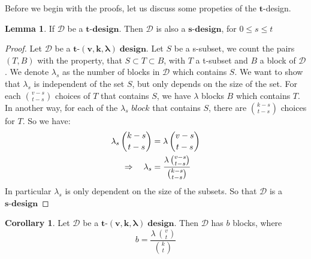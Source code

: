 \documentclass[12pt]{article}
\theoremstyle{definition}
\newtheorem{lemma}[theorem]{Lemma}
\newtheorem{collary}[theorem]{Corollary}
\numberwithin{equation}{theorem}
\numberwithin{figure}{theorem}
\newcommand{\tCompleteDesign}{\ensuremath{\bm{t\mbox{-}(v,k,\lambda)\; design}}}
\newcommand{\myBlock}{{block}}
\newcommand{\pluralMyBlock}{{blocks}}
\newcommand{\xDesign}[1]{\ensuremath{\bm{#1\mbox{-}design}}}
\newcommand{\dDes}{\ensuremath{\mathcal{D}}}
\begin{document}
Before we begin with the proofs, let us discuss some propeties of the $\bm{t}$-design.
\begin{lemma}\label{propTdesign}
If {\dDes} be a $\bm{t\mbox{-}design}$. Then {\dDes} is also a $\bm{s\mbox{-}design}$, for $0 \leq s \leq t$
\end{lemma}
\begin{proof}
Let {\dDes} be a \tCompleteDesign.
Let $S$ be a s-subset, we count the pairs $(T,B)$ with the property, that $S \subset T \subset B$, with $T$ a t-subset and $B$ a block of {\dDes}. We denote $\lambda_s$ as the number of blocks in {\dDes} which contains $S$. We want to show that $\lambda_s$ is independent of the set $S$, but only depends on the size of the set. 
For each $\binom{v-s}{t-s}$ choices of $T$ that contains $S$, we have $\lambda$ {\pluralMyBlock} $B$ which contains $T$. In another way, for each of the $\lambda_s$ $\myBlock$ that contains $S$, there are $\binom{k-s}{t-s}$ choices for $T$. So we have:
\begin{align}
	\lambda_s \, \binom{k-s}{t-s} &= \lambda \, \binom{v-s}{t-s} \notag\\
	\Rightarrow  \quad \lambda_s &= \frac{\lambda \, \binom{v-s}{t-s}}{\binom{k-s}{t-s}} \label{sDesign}
\end{align}
In particular $\lambda_s$ is only dependent on the size of the subsets. So that {\dDes} is a \xDesign{s}
\end{proof}

\begin{collary}\label{blockCount}
Let {\dDes} be a \tCompleteDesign.
Then {\dDes} has $b$ blocks, where
\[
	b = \frac{\lambda \, \binom{v}{t}}{\binom{k}{t}}
\]
\end{collary}
\end{document}
